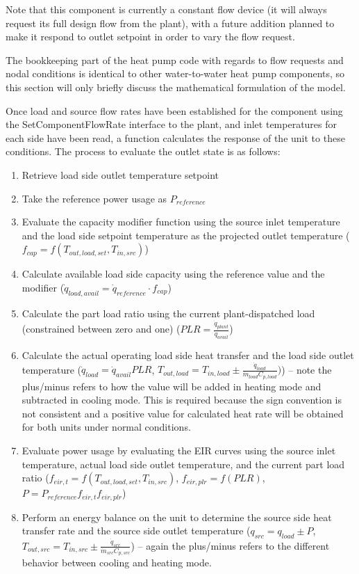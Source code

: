 Note that this component is currently a constant flow device (it will always request its full design flow from the plant), with a future addition planned to make it respond to outlet setpoint in order to vary the flow request.

The bookkeeping part of the heat pump code with regards to flow requests and nodal conditions is identical to other water-to-water heat pump components, so this section will only briefly discuss the mathematical formulation of the model.

Once load and source flow rates have been established for the component using the SetComponentFlowRate interface to the plant, and inlet temperatures for each side have been read, a function calculates the response of the unit to these conditions.  The process to evaluate the outlet state is as follows:

\begin{enumerate}
	\item Retrieve load side outlet temperature setpoint
    \item Take the reference power usage as $P_{reference}$
	\item Evaluate the capacity modifier function using the source inlet temperature and the load side setpoint temperature as the projected outlet temperature ($f_{cap} = f(T_{out,load,set}, T_{in,src}) $)
	\item Calculate available load side capacity using the reference value and the modifier ($\dot{q}_{load,avail} = \dot{q}_{reference} \cdot f_{cap}$)
	\item Calculate the part load ratio using the current plant-dispatched load (constrained between zero and one) ($PLR = \frac{\dot{q}_{plant}}{\dot{q}_{avail}}$)
	\item Calculate the actual operating load side heat transfer and the load side outlet temperature ($\dot{q}_{load} = \dot{q}_{avail}PLR$, $T_{out,load} = T_{in,load} \pm \frac{\dot{q}_{load}}{\dot{m}_{load}C_{p,load}}) $) -- note the plus/minus refers to how the value will be added in heating mode and subtracted in cooling mode.  This is required because the sign convention is not consistent and a positive value for calculated heat rate will be obtained for both units under normal conditions.
	\item Evaluate power usage by evaluating the EIR curves using the source inlet temperature, actual load side outlet temperature, and the current part load ratio ($f_{eir,t} = f(T_{out,load,set}, T_{in,src})$, $f_{eir,plr} = f(PLR)$, $P = P_{reference} f_{eir,t} f_{eir,plr}$)
	\item Perform an energy balance on the unit to determine the source side heat transfer rate and the source side outlet temperature ($q_{src} = q_{load} \pm P$, $T_{out,src} = T_{in,src} \pm \frac{\dot{q}_{src}}{\dot{m}_{src}C_{p,src}} $) -- again the plus/minus refers to the different behavior between cooling and heating mode.
\end{enumerate}
